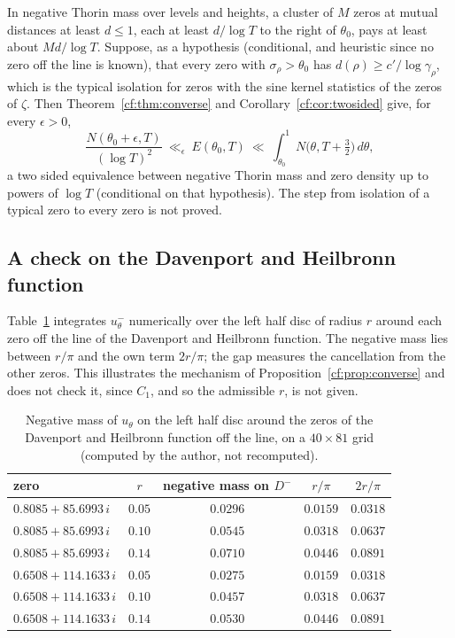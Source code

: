 In negative Thorin mass over levels and heights, a cluster of $M$ zeros at mutual distances at least $d\le1$, each at least $d/\log T$ to the right of $\theta_0$, pays at least about $Md/\log T$. Suppose, as a hypothesis (conditional, and heuristic since no zero off the line is known), that every zero with $\sigma_\rho>\theta_0$ has $d(\rho)\ge c'/\log\gamma_\rho$, which is the typical isolation for zeros with the sine kernel statistics of the zeros of $\zeta$. Then Theorem~\ref{cf:thm:converse} and Corollary~\ref{cf:cor:twosided} give, for every $\epsilon>0$,
\[
\frac{N(\theta_0+\epsilon,T)}{(\log T)^2}\ \ll_{\epsilon}\ E(\theta_0,T)\ \ll\ \int_{\theta_0}^1N\bigl(\theta,T+\tfrac32\bigr)\,d\theta,
\]
a two sided equivalence between negative Thorin mass and zero density up to powers of $\log T$ (conditional on that hypothesis). The step from isolation of a typical zero to every zero is not proved.

\subsection{A check on the Davenport and Heilbronn function}

Table~\ref{cf:tab:halfdisc} integrates $u_\theta^-$ numerically over the left half disc of radius $r$ around each zero off the line of the Davenport and Heilbronn function. The negative mass lies between $r/\pi$ and the own term $2r/\pi$; the gap measures the cancellation from the other zeros. This illustrates the mechanism of Proposition~\ref{cf:prop:converse} and does not check it, since $C_1$, and so the admissible $r$, is not given.

\begin{table}[h]
\centering
\begin{tabular}{lcccc}
\toprule
zero & $r$ & negative mass on $D^-$ & $r/\pi$ & $2r/\pi$\\
\midrule
$0.8085+85.6993\,i$ & $0.05$ & $0.0296$ & $0.0159$ & $0.0318$\\
$0.8085+85.6993\,i$ & $0.10$ & $0.0545$ & $0.0318$ & $0.0637$\\
$0.8085+85.6993\,i$ & $0.14$ & $0.0710$ & $0.0446$ & $0.0891$\\
$0.6508+114.1633\,i$ & $0.05$ & $0.0275$ & $0.0159$ & $0.0318$\\
$0.6508+114.1633\,i$ & $0.10$ & $0.0457$ & $0.0318$ & $0.0637$\\
$0.6508+114.1633\,i$ & $0.14$ & $0.0530$ & $0.0446$ & $0.0891$\\
\bottomrule
\end{tabular}
\caption{Negative mass of $u_\theta$ on the left half disc around the zeros of the Davenport and Heilbronn function off the line, on a $40\times81$ grid (computed by the author, not recomputed).}
\label{cf:tab:halfdisc}
\end{table}


